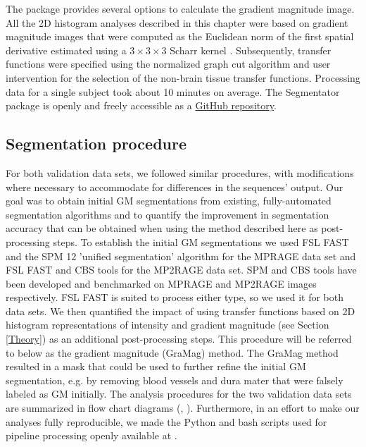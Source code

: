 The package provides several options to calculate the gradient magnitude image. All the 2D histogram analyses described in this chapter were based on gradient magnitude images that were computed as the Euclidean norm of the first spatial derivative estimated using a $3 \times 3 \times 3$ Scharr kernel \parencite{Scharr2000, Jahne2000}. Subsequently, transfer functions were specified using the normalized graph cut algorithm and user intervention for the selection of the non-brain tissue transfer functions. Processing data for a single subject took about 10 minutes on average. The Segmentator package is openly and freely accessible as a \href{https://github.com/ofgulban/segmentator}{GitHub repository}.

\subsection{Segmentation procedure}
For both validation data sets, we followed similar procedures, with modifications where necessary to accommodate for differences in the sequences' output. Our goal was to obtain initial GM segmentations from existing, fully-automated segmentation algorithms and to quantify the improvement in segmentation accuracy that can be obtained when using the method described here as post-processing steps. To establish the initial GM segmentations we used FSL FAST \parencite{Zhang2001} and the SPM 12 'unified segmentation' algorithm \parencite{Ashburner2005} for the MPRAGE data set and FSL FAST and CBS tools \parencite{Bazin2014} for the MP2RAGE data set. SPM and CBS tools have been developed and benchmarked on MPRAGE and MP2RAGE images respectively. FSL FAST is suited to process either type, so we used it for both data sets. We then quantified the impact of using transfer functions based on 2D histogram representations of intensity and gradient magnitude (see Section \ref{Theory}) as an additional post-processing steps. This procedure will be referred to below as the gradient magnitude (GraMag) method. The GraMag method resulted in a mask that could be used to further refine the initial GM segmentation, e.g. by removing blood vessels and dura mater that were falsely labeled as GM initially. The analysis procedures for the two validation data sets are summarized in flow chart diagrams (, ). Furthermore, in an effort to make our analyses fully reproducible, we made the Python and bash scripts used for pipeline processing openly available at \cite{segmentator_processing_scripts}.

